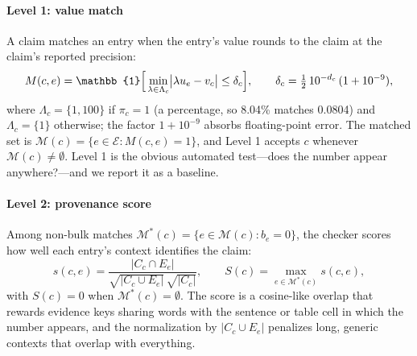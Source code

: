 \documentclass[preprint,12pt,authoryear]{elsarticle}
\begin{document}
\paragraph{Level 1: value match} A claim matches an entry when the entry's value rounds to the claim at the claim's reported precision:
\begin{equation}
M(c,e) = \mathbb{1}\Bigl[\,\min_{\lambda\in\Lambda_c} \bigl|\lambda u_e - v_c\bigr| \le \delta_c \Bigr], \qquad \delta_c = \tfrac{1}{2}\,10^{-d_c}\,(1+10^{-9}),
\label{eq:match}
\end{equation}
where $\Lambda_c=\{1,100\}$ if $\pi_c=1$ (a percentage, so 8.04\% matches 0.0804) and $\Lambda_c=\{1\}$ otherwise; the factor $1+10^{-9}$ absorbs floating-point error. The matched set is $\mathcal{M}(c)=\{e\in\mathcal{E}: M(c,e)=1\}$, and Level 1 accepts $c$ whenever $\mathcal{M}(c)\neq\emptyset$. Level 1 is the obvious automated test---does the number appear anywhere?---and we report it as a baseline.

\paragraph{Level 2: provenance score} Among non-bulk matches $\mathcal{M}^{*}(c)=\{e\in\mathcal{M}(c): b_e=0\}$, the checker scores how well each entry's context identifies the claim:
\begin{equation}
s(c,e) = \frac{|C_c\cap E_e|}{\sqrt{|C_c\cup E_e|}\,\sqrt{|C_c|}}, \qquad S(c) = \max_{e\in\mathcal{M}^{*}(c)} s(c,e),
\label{eq:score}
\end{equation}
with $S(c)=0$ when $\mathcal{M}^{*}(c)=\emptyset$. The score is a cosine-like overlap that rewards evidence keys sharing words with the sentence or table cell in which the number appears, and the normalization by $|C_c\cup E_e|$ penalizes long, generic contexts that overlap with everything.
\end{document}
